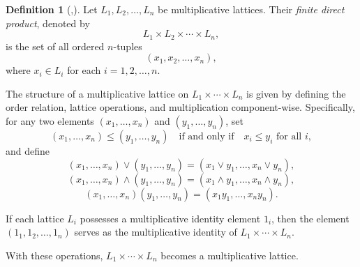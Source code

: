 \documentclass[10pt,twoside,a4paper]{amsart}
\numberwithin{equation}{section}
\theoremstyle{plain}
\theoremstyle{definition}
\newtheorem{rem}[lem]{Remark}
\newtheorem{defn}[lem]{Definition}
\newtheorem{definition}[lem]{Definition}
\begin{document}
		

\begin{definition}[\cite{Birkhoff1967},\cite{WD}]
	Let $L_1, L_2, \dots, L_n$ be multiplicative lattices. Their \emph{finite direct product}, denoted by
	\[
	L_1 \times L_2 \times \cdots \times L_n,
	\]
	is the set of all ordered $n$-tuples
	\[
	(x_1, x_2, \dots, x_n),
	\]
	where $x_i \in L_i$ for each $i = 1,2,\dots,n$.
	
	The structure of a multiplicative lattice on $L_1 \times \cdots \times L_n$ is given by defining the order relation, lattice operations, and multiplication component-wise. Specifically, for any two elements $(x_1,\dots,x_n)$ and $(y_1,\dots,y_n)$, set
	\[
	(x_1,\dots,x_n) \leq (y_1,\dots,y_n) \quad \text{if and only if} \quad x_i \leq y_i \text{ for all } i,
	\]
	and define
	\[
	(x_1,\dots,x_n) \vee (y_1,\dots,y_n) = (x_1 \vee y_1,\dots,x_n \vee y_n),
	\]
	\[
	(x_1,\dots,x_n) \wedge (y_1,\dots,y_n) = (x_1 \wedge y_1,\dots,x_n \wedge y_n),
	\]
	\[
	(x_1,\dots,x_n)(y_1,\dots,y_n) = (x_1 y_1,\dots,x_n y_n).
	\]
	
	If each lattice $L_i$ possesses a multiplicative identity element $1_i$, then the element $(1_1,1_2,\dots,1_n)$ serves as the multiplicative identity of $L_1 \times \cdots \times L_n$.
	
	With these operations, $L_1 \times \cdots \times L_n$ becomes a multiplicative lattice.
\end{definition}
\end{document}
